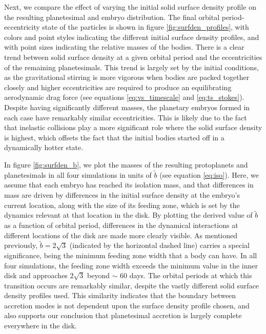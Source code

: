 \documentclass[twocolumn]{aastex63}
\begin{document}
Next, we compare the effect of varying the initial solid surface
density profile on the resulting planetesimal and embryo
distribution. The final orbital period-eccentricity state of the
particles is shown in figure \ref{fig:surfden_profiles}, with colors
and point styles indicating the different initial surface density profiles,
and with point sizes indicating the relative masses of the bodies. There is a clear trend between solid surface density at a given orbital period and the eccentricities of the remaining planetesimals. This trend is largely set by the initial conditions, as the gravitational stirring is more vigorous when bodies are packed together closely and higher eccentricities are required to produce an equilibrating aerodynamic drag force (see equations \ref{eq:vs_timescale} and \ref{eq:ts_stokes}). Despite having significantly different masses, the planetary embryos formed in each case have remarkably similar eccentricities. This is likely due to the fact that inelastic collisions play a more significant role where the solid surface density is highest, which offsets the fact that the initial bodies started off in a dynamically hotter state.


In figure \ref{fig:surfden_b}, we plot the masses of the resulting protoplanets and planetesimals in all four simulations in units of $\tilde{b}$ (see equation \ref{eq:iso}). Here, we assume that each embryo has reached its isolation mass, and that differences in mass are driven by differences in the initial surface density at the embryo's current location, along with the size of its feeding zone, which is set by the dynamics relevant at that location in the disk. By plotting the derived value of $\tilde{b}$ as a function of orbital period, differences in the dynamical interactions at different locations of the disk are made more clearly visible. As mentioned previously, $\tilde{b} = 2 \sqrt{3}$ (indicated by the horizontal dashed line) carries a special significance, being the minimum feeding zone width that a body can have. In all four simulations, the feeding zone width exceeds the minimum value in the inner disk and approaches $2 \sqrt{3}$ beyond $\sim$ 60 days. The orbital periods at which this transition occurs are remarkably similar, despite the vastly different solid surface density profiles used. This similarity indicates that the boundary between accretion modes is not dependent upon the surface density profile chosen, and also supports our conclusion that planetesimal accretion is largely complete everywhere in the disk.
\end{document}
